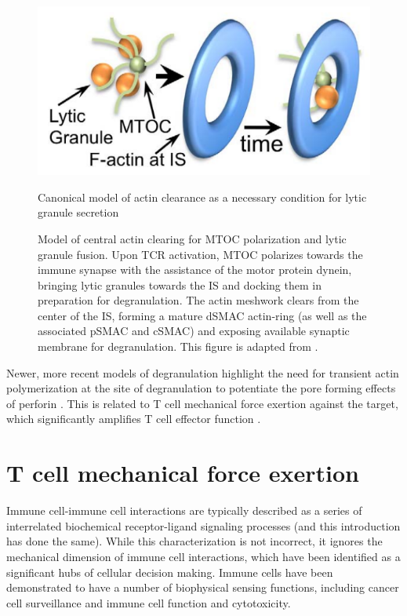 \begin{figure}[htbp]
	\centering
	\includegraphics[width=\textwidth]{../figures/chapter1/actinclearance.png}
	\caption{Canonical model of actin clearance as a necessary condition for lytic granule secretion}
	\caption*{Model of central actin clearing for MTOC polarization and lytic granule fusion. Upon TCR activation, MTOC polarizes towards the immune synapse with the assistance of the motor protein dynein, bringing lytic granules towards the IS and docking them in preparation for degranulation. The actin meshwork clears from the center of the IS, forming a mature dSMAC actin-ring (as well as the associated pSMAC and cSMAC) and exposing available synaptic membrane for degranulation. This figure is adapted from \cite{Rak2011}.}
	\label{fig:actinclearance}
\end{figure}

Newer, more recent models of degranulation highlight the need for transient actin polymerization at the site of degranulation to potentiate the pore forming effects of perforin \cite{Tamzalit2018}. This is related to T cell mechanical force exertion against the target, which significantly amplifies T cell effector function \cite{Tamzalit2018}.

\section{T cell mechanical force exertion}
Immune cell-immune cell interactions are typically described as a series of interrelated biochemical receptor-ligand signaling processes (and this introduction has done the same). While this characterization is not incorrect, it ignores the mechanical dimension of immune cell interactions, which have been identified as a significant hubs of cellular decision making. Immune cells have been demonstrated to have a number of biophysical sensing functions, including cancer cell surveillance and immune cell function and cytotoxicity. 

